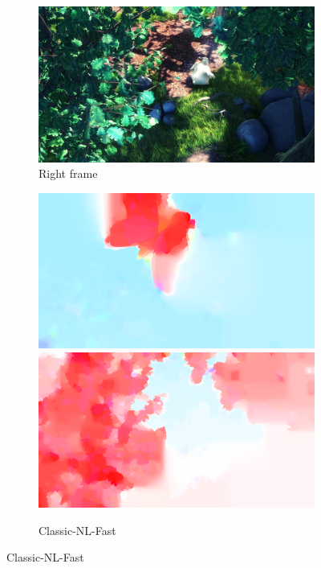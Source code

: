 \begin{figure}
\begin{subfigure}[t]{0.24\textwidth}
		\includegraphics[width=\textwidth]{figures/frames/right/frame-0391}
		\caption{Right frame}
	\end{subfigure}
	\begin{subfigure}[t]{0.24\textwidth}
		\includegraphics[width=\textwidth]{figures/classicnlp/frame-0076}\\
		\includegraphics[width=\textwidth]{figures/classicnlp/frame-0391}
		\caption{Classic-NL-Fast}
	\end{subfigure}

\end{figure}
